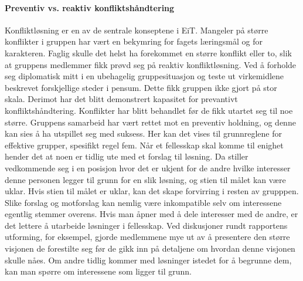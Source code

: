 \paragraph{Preventiv vs. reaktiv konfliktshåndtering}
Konfliktløsning er en av de sentrale konseptene i EiT.
Mangeler på større konflikter i gruppen har vært en bekymring for fagets læringsmål og for karakteren. 
Faglig skulle det helst ha forekommet en større konflikt eller to, slik at gruppens medlemmer fikk prøvd seg på reaktiv konfliktløsning. 
Ved å forholde seg diplomatisk mitt i en ubehagelig gruppesituasjon og teste ut virkemidlene beskrevet forskjellige steder i pensum. 
Dette fikk gruppen ikke gjort på stor skala.
Derimot har det blitt demonstrert kapasitet for prevantivt konfliktshåndtering. 
Konflikter har blitt behandlet før de fikk utartet seg til noe større. 
Gruppens samarbeid har vært rettet mot en preventiv holdning, og denne kan sies å ha utspillet seg med suksess. 
Her kan det vises til grunnreglene for effektive grupper\cite{schwarz}, spesifikt regel fem. 
Når et fellesskap skal komme til enighet hender det at noen er tidlig ute med et forslag til løsning.
Da stiller vedkommende seg i en posisjon hvor det er ukjent for de andre hvilke interesser denne personen legger til  grunn for en slik løsning, og stien til målet kan være uklar. 
Hvis stien til målet er uklar, kan det skape forvirring i resten av grupppen. 
Slike forslag og motforslag kan nemlig være inkompatible selv om interessene egentlig stemmer overens.
Hvis man åpner med å dele interesser med de andre, er det lettere å utarbeide løsninger i fellesskap.
Ved diskusjoner rundt rapportens utforming, for eksempel, gjorde medlemmene mye ut av å presentere den større visjonen de forestilte seg før de gikk inn på detaljene om hvordan denne visjonen skulle nåes. 
Om andre tidlig kommer med løsninger istedet for å begrunne dem, kan man spørre om interessene som ligger til grunn.

